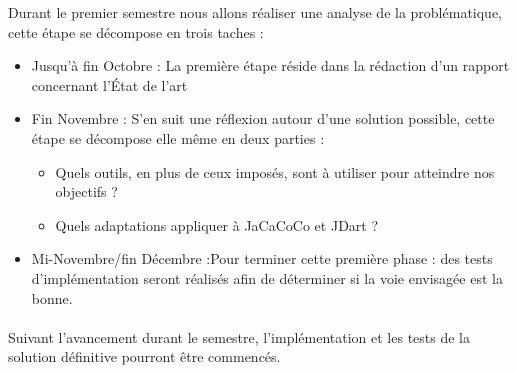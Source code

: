 
Durant le premier semestre nous allons réaliser une analyse de la problématique, cette étape se décompose en trois taches :
\begin{itemize}
	\item Jusqu'à fin Octobre : La première étape réside dans la rédaction d'un rapport concernant l'État de l'art
	\item Fin Novembre : S'en suit une réflexion autour d'une solution possible, cette étape se décompose elle même en deux parties :
		\begin{itemize}
		 \item Quels outils, en plus de ceux imposés, sont à utiliser pour atteindre nos objectifs ?
		 \item Quels adaptations appliquer à JaCaCoCo et JDart ?	
		\end{itemize}	
	\item Mi-Novembre/fin Décembre :Pour terminer cette première phase : des tests d'implémentation seront réalisés afin de déterminer si la voie envisagée est la bonne.
\end{itemize}
	
\paragraph{}
Suivant l'avancement durant le semestre, l'implémentation et les tests de la solution définitive pourront être commencés.